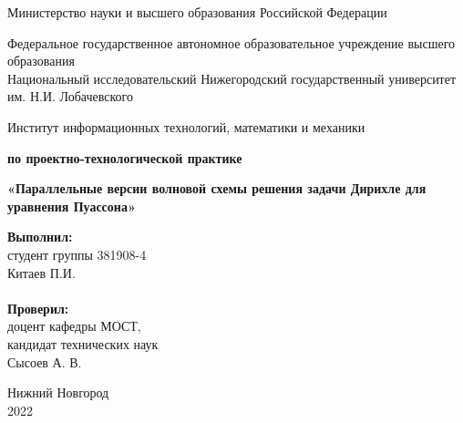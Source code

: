 \documentclass{report}
\begin{document}
\begin{titlepage}

\begin{center}
Министерство науки и высшего образования Российской Федерации
\end{center}

\begin{center}
Федеральное государственное автономное образовательное учреждение высшего образования \\
Национальный исследовательский Нижегородский государственный университет им. Н.И. Лобачевского
\end{center}

\begin{center}
Институт информационных технологий, математики и механики
\end{center}

\vspace{4em}

\begin{center}
\textbf{ по проектно-технологической практике}
\end{center}
\begin{center}
\textbf{\Large«Параллельные версии волновой схемы решения задачи Дирихле для уравнения Пуассона»}
\end{center}

\vspace{4em}

\newbox{\lbox}
\newlength{\maxl}
\setlength{\maxl}{\wd\lbox}
\hfill\parbox{7cm}{
\hspace*{5cm}\hspace*{-5cm}\textbf{Выполнил:} \\ студент группы 381908-4 \\ Китаев П.И. \\
\\
\hspace*{5cm}\hspace*{-5cm}\textbf{Проверил:}\\ доцент кафедры МОСТ, \\ кандидат технических наук \\ Сысоев А. В.\\}
\vspace{\fill}

\begin{center} Нижний Новгород \\ 2022 \end{center}
\end{titlepage}
\end{document}
